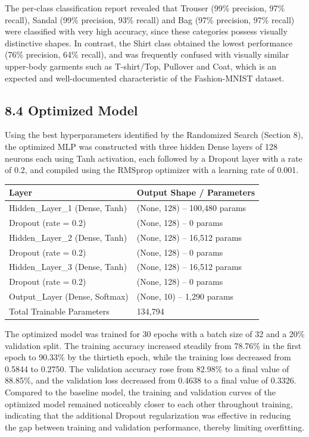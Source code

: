 \documentclass[11pt,a4paper]{article}
\begin{document}
The per-class classification report revealed that Trouser (99\% precision, 97\% recall), Sandal (99\% precision, 93\% recall) and Bag (97\% precision, 97\% recall) were classified with very high accuracy, since these categories possess visually distinctive shapes. In contrast, the Shirt class obtained the lowest performance (76\% precision, 64\% recall), and was frequently confused with visually similar upper-body garments such as T-shirt/Top, Pullover and Coat, which is an expected and well-documented characteristic of the Fashion-MNIST dataset.


\subsection*{8.4 Optimized Model}

Using the best hyperparameters identified by the Randomized Search (Section 8), the optimized MLP was constructed with three hidden Dense layers of 128 neurons each using Tanh activation, each followed by a Dropout layer with a rate of 0.2, and compiled using the RMSprop optimizer with a learning rate of 0.001.

\begin{center}
\begin{tabular}{|p{6cm}|p{6cm}|}
\hline
\textbf{Layer} & \textbf{Output Shape / Parameters}\\
\hline
Hidden\_Layer\_1 (Dense, Tanh) & (None, 128) -- 100{,}480 params\\
\hline
Dropout (rate = 0.2) & (None, 128) -- 0 params\\
\hline
Hidden\_Layer\_2 (Dense, Tanh) & (None, 128) -- 16{,}512 params\\
\hline
Dropout (rate = 0.2) & (None, 128) -- 0 params\\
\hline
Hidden\_Layer\_3 (Dense, Tanh) & (None, 128) -- 16{,}512 params\\
\hline
Dropout (rate = 0.2) & (None, 128) -- 0 params\\
\hline
Output\_Layer (Dense, Softmax) & (None, 10) -- 1{,}290 params\\
\hline
Total Trainable Parameters & 134{,}794\\
\hline
\end{tabular}
\end{center}

\vspace{0.15cm}

The optimized model was trained for 30 epochs with a batch size of 32 and a 20\% validation split. The training accuracy increased steadily from 78.76\% in the first epoch to 90.33\% by the thirtieth epoch, while the training loss decreased from 0.5844 to 0.2750. The validation accuracy rose from 82.98\% to a final value of 88.85\%, and the validation loss decreased from 0.4638 to a final value of 0.3326. Compared to the baseline model, the training and validation curves of the optimized model remained noticeably closer to each other throughout training, indicating that the additional Dropout regularization was effective in reducing the gap between training and validation performance, thereby limiting overfitting.
\end{document}
